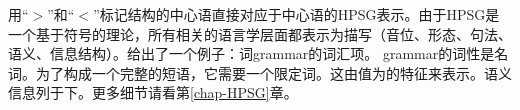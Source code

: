 用“$>$”和“$<$”标记结构的中心语直接对应于中心语的HPSG表示。由于HPSG是一个基于符号的理论，所有相关的语言学层面都表示为描写（音位、形态、句法、语义、信息结构）。给出了一个例子：词grammar的词汇项。
\ea 
{}
\z
grammar的词性是名词。为了构成一个完整的短语，它需要一个限定词。这由值为的\sprc 特征来表示。语义信息列于\contc 下。更多细节请看第\ref{chap-HPSG}章。

